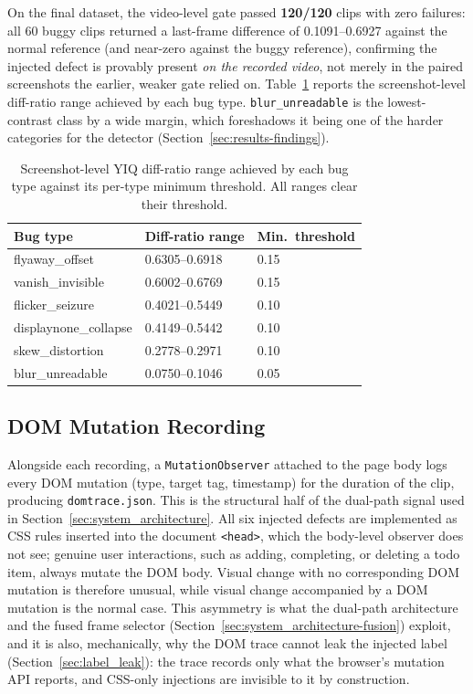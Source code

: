 On the final dataset, the video-level gate passed \textbf{120/120} clips with zero failures: all 60 buggy clips returned a last-frame difference of \numrange{0.1091}{0.6927} against the normal reference (and near-zero against the buggy reference), confirming the injected defect is provably present \emph{on the recorded video}, not merely in the paired screenshots the earlier, weaker gate relied on. Table~\ref{tab:diff-ratios} reports the screenshot-level diff-ratio range achieved by each bug type. \texttt{blur\_unreadable} is the lowest-contrast class by a wide margin, which foreshadows it being one of the harder categories for the detector (Section~\ref{sec:results-findings}).

\begin{table}[htbp]
\centering
\caption[Screenshot diff-ratio range by bug type]{Screenshot-level YIQ diff-ratio range achieved by each bug type against its per-type minimum threshold. All ranges clear their threshold.}
\label{tab:diff-ratios}
\begin{tabular}{@{}lll@{}}
\toprule
Bug type & Diff-ratio range & Min.\ threshold \\
\midrule
flyaway\_offset       & \numrange{0.6305}{0.6918} & 0.15 \\
vanish\_invisible     & \numrange{0.6002}{0.6769} & 0.15 \\
flicker\_seizure      & \numrange{0.4021}{0.5449} & 0.10 \\
displaynone\_collapse & \numrange{0.4149}{0.5442} & 0.10 \\
skew\_distortion      & \numrange{0.2778}{0.2971} & 0.10 \\
blur\_unreadable      & \numrange{0.0750}{0.1046} & 0.05 \\
\bottomrule
\end{tabular}
\end{table}

\subsection{DOM Mutation Recording}
\label{sec:data_prep-dom}
Alongside each recording, a \texttt{MutationObserver} attached to the page body logs every DOM mutation (type, target tag, timestamp) for the duration of the clip, producing \texttt{domtrace.json}. This is the structural half of the dual-path signal used in Section~\ref{sec:system_architecture}. All six injected defects are implemented as CSS rules inserted into the document \texttt{<head>}, which the body-level observer does not see; genuine user interactions, such as adding, completing, or deleting a todo item, always mutate the DOM body. Visual change with no corresponding DOM mutation is therefore unusual, while visual change accompanied by a DOM mutation is the normal case. This asymmetry is what the dual-path architecture and the fused frame selector (Section~\ref{sec:system_architecture-fusion}) exploit, and it is also, mechanically, why the DOM trace cannot leak the injected label (Section~\ref{sec:label_leak}): the trace records only what the browser's mutation API reports, and CSS-only injections are invisible to it by construction.

